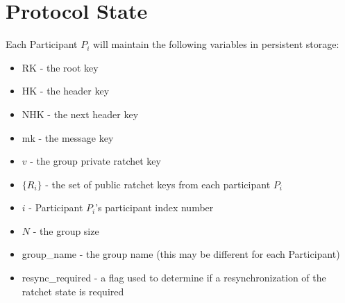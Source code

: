 \documentclass[%
preprint,
amsmath,amssymb,
aps,
prb,
floatfix,
]{revtex4-1}
\begin{document}
\section{\label{sec:protocolstate}Protocol State}
Each Participant $P_i$ will maintain the following variables in persistent
storage:
\begin{itemize}
\item RK - the root key
\item HK - the header key
\item NHK - the next header key
\item mk - the message key
\item $v$ - the group private ratchet key
\item $\{R_i\}$ - the set of public ratchet keys from each participant $P_i$
\item $i$ - Participant $P_i$'s participant index number
\item $N$ - the group size
\item group\_name - the group name (this may be different for each Participant)
\item resync\_required - a flag used to determine if a resynchronization of the
ratchet state is required
\end{itemize}
\end{document}
